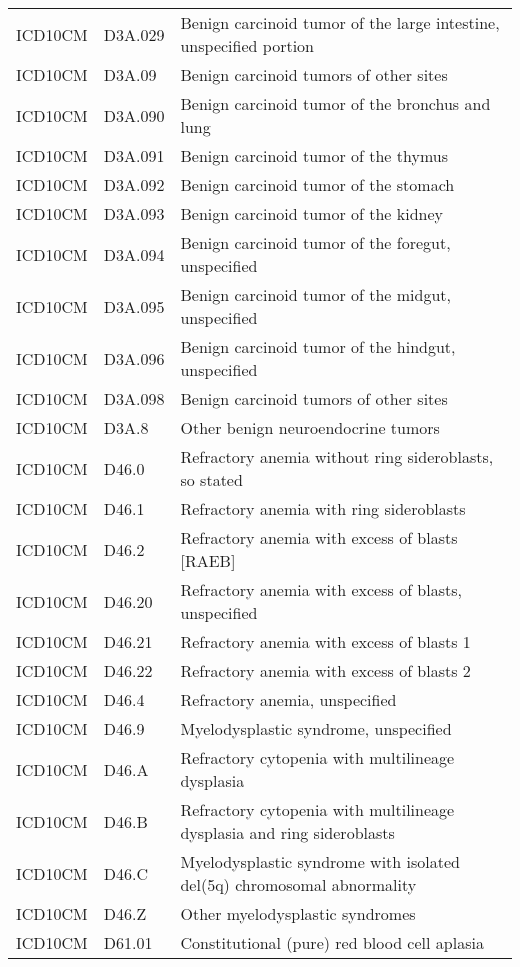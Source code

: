 \begin{table}[ht]
\begin{tabular}{lll}
  ICD10CM & D3A.029 & Benign carcinoid tumor of the large intestine, unspecified portion \\ 
  ICD10CM & D3A.09 & Benign carcinoid tumors of other sites \\ 
  ICD10CM & D3A.090 & Benign carcinoid tumor of the bronchus and lung \\ 
  ICD10CM & D3A.091 & Benign carcinoid tumor of the thymus \\ 
  ICD10CM & D3A.092 & Benign carcinoid tumor of the stomach \\ 
  ICD10CM & D3A.093 & Benign carcinoid tumor of the kidney \\ 
  ICD10CM & D3A.094 & Benign carcinoid tumor of the foregut, unspecified \\ 
  ICD10CM & D3A.095 & Benign carcinoid tumor of the midgut, unspecified \\ 
  ICD10CM & D3A.096 & Benign carcinoid tumor of the hindgut, unspecified \\ 
  ICD10CM & D3A.098 & Benign carcinoid tumors of other sites \\ 
  ICD10CM & D3A.8 & Other benign neuroendocrine tumors \\ 
  ICD10CM & D46.0 & Refractory anemia without ring sideroblasts, so stated \\ 
  ICD10CM & D46.1 & Refractory anemia with ring sideroblasts \\ 
  ICD10CM & D46.2 & Refractory anemia with excess of blasts [RAEB] \\ 
  ICD10CM & D46.20 & Refractory anemia with excess of blasts, unspecified \\ 
  ICD10CM & D46.21 & Refractory anemia with excess of blasts 1 \\ 
  ICD10CM & D46.22 & Refractory anemia with excess of blasts 2 \\ 
  ICD10CM & D46.4 & Refractory anemia, unspecified \\ 
  ICD10CM & D46.9 & Myelodysplastic syndrome, unspecified \\ 
  ICD10CM & D46.A & Refractory cytopenia with multilineage dysplasia \\ 
  ICD10CM & D46.B & Refractory cytopenia with multilineage dysplasia and ring sideroblasts \\ 
  ICD10CM & D46.C & Myelodysplastic syndrome with isolated del(5q) chromosomal abnormality \\ 
  ICD10CM & D46.Z & Other myelodysplastic syndromes \\ 
  ICD10CM & D61.01 & Constitutional (pure) red blood cell aplasia \\ 

\end{tabular}
\end{table}
